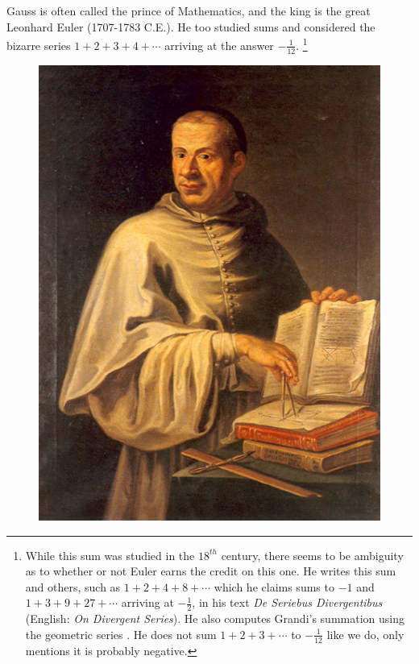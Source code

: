     \begin{example}
        \label{ex:logic_euler_sum_natural_numbers}%
        Gauss is often called the prince of Mathematics, and the king is the
        great Leonhard Euler (1707-1783 C.E.). He too
        studied sums and considered the bizarre series $1+2+3+4+\cdots$ arriving
        at the answer $\minus\frac{1}{12}$.%
        \footnote{%
            While this sum was studied in the $18^{th}$ century, there seems to
            be ambiguity as to whether or not Euler earns the credit on this
            one. He writes this sum and others, such as $1+2+4+8+\cdots$ which
            he claims sums to $\minus{1}$ and $1+3+9+27+\cdots$ arriving at
            $\minus\frac{1}{2}$, in his text \textit{De Seriebus Divergentibus}
            (English: \textit{On Divergent Series}). He also computes Grandi's
            summation using the geometric series
            \cite[p.~206-208]{euler2012seriebus}. He does not sum $1+2+3+\cdots$
            to $\minus\frac{1}{12}$ like we do, only mentions it is probably
            negative.
        }
        \begin{figure}
            \centering
            \captionsetup{type=figure}
            \includegraphics{images/GuidoGrandi.jpg}

\end{figure}
\end{example}
